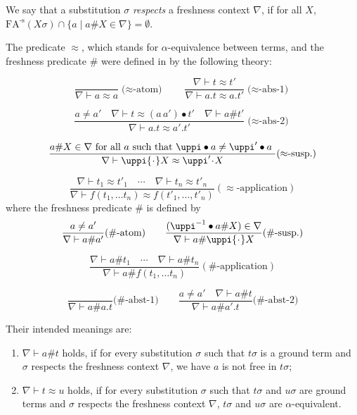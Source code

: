 \documentclass[11pt,a4paper]{amsart}
\theoremstyle{definition}
\newcommand{\permap}{{\mkern 1mu\cdot \mkern 1mu}}
\newcommand{\permef}{\bullet}
\newcommand\ppi{\uppi}
\newcommand{\fatoms}{\mathrm{FA^{\text{-s}}}}
\begin{document}
We say that a substitution $\sigma$ \emph{respects} a freshness
context $\nabla$, if for all $X$, $\fatoms(X\sigma)\cap
\{a \mid a\# X \in \nabla\} = \emptyset$.

The predicate $\approx$, which stands for $\alpha$-equivalence between terms, 
and the freshness predicate $ \#$ were defined in
\cite{DBLP:conf/csl/UrbanPG03,DBLP:journals/tcs/UrbanPG04} by the following theory:

\[\frac{}{ \nabla\vdash a\approx a}\text{($\approx$-atom)}\qquad \frac{ \nabla \vdash t \approx t'}{ \nabla\vdash a.t\approx a.t'}\text{($\approx$-abs-1)} \]

\[\frac{ a\neq a'\quad \nabla \vdash t \approx (a\,a')\permef t' \quad \nabla \vdash a\# t'}{ \nabla\vdash a.t\approx a'.t'}\text{($\approx$-abs-2)}\]

\[\frac{{ a\# X}\in \nabla \text{ for all $a$ such that $ \ppi \permef a \neq \ppi'\permef a$ }}{ \nabla \vdash \ppi \permap X \approx \ppi'\permap X}\text{($\approx$-susp.)}\]

\[\frac{ \nabla \vdash t_1\approx t'_1 \quad \cdots \quad \nabla \vdash t_n\approx t'_n}{ \nabla \vdash f(t_1,\ldots t_n)\approx f(t'_1,\ldots,t'_n)}(\text{$\approx$-application})\]
%
where the freshness predicate $ \#$ is defined by
%
\[\frac{ a\neq a'}{ \nabla \vdash a\# a'}\text{($\#$-atom)}\qquad \frac{ (\ppi^{-1}\permef a\# X)\in \nabla}{ \nabla \vdash a\#\ppi\permap X}\text{($\#$-susp.)}\]

\[\frac{ \nabla \vdash a\#t_1 \quad \cdots \quad \nabla \vdash a\#t_n}{ \nabla \vdash a\#f(t_1,\ldots t_n)}(\text{$\#$-application})\]

\[\frac{}{ \nabla \vdash a\# a.t}\text{($\#$-abst-1)}\qquad \frac{ a\neq a' \quad \nabla\vdash a\# t}{ \nabla \vdash a\#a'.t}\text{($\#$-abst-2)}\]


Their intended meanings are:
\begin{enumerate}
  \item $ \nabla \vdash a \# t$ holds, if for every substitution
    $\sigma$ such that $t\sigma$ is a ground term and $\sigma$ respects the freshness context $\nabla$, we have $a$ is not
    free in $ t\sigma$;
  \item $ \nabla \vdash t \approx u$ holds, if for every substitution
    $\sigma$ such that $t\sigma$ and $u\sigma$ are ground terms and $\sigma$ respects the freshness context $\nabla$, $t\sigma$ and $u\sigma$ are $\alpha$-equivalent.
\end{enumerate}
\end{document}
